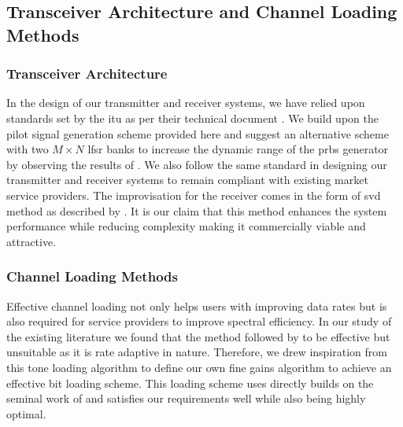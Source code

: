 \subsection{Transceiver Architecture and Channel Loading Methods}
\subsubsection{Transceiver Architecture}
In the design of our transmitter and receiver systems, we have relied upon standards set by the \acrshort{itu} as per their technical document \textcite{ITU2009}. We build upon the \gls{pilot signal} generation scheme provided here and suggest an alternative scheme with two $M \times N$ \acrshort{lfsr} banks to increase the dynamic range of the \acrshort{prbs} generator by observing the results of \textcite{Peinado2013}. We also follow the same \textcite{ITU2009} standard in designing our transmitter and receiver systems to remain compliant with existing market service providers. The improvisation for the receiver comes in the form of \acrlong{svd} method as described by \textcite{Klema1980}. It is our claim that this method enhances the system performance while reducing complexity making it commercially viable and attractive. 

\subsubsection{Channel Loading Methods}
Effective channel loading not only helps users with improving data rates but is also required for service providers to improve spectral efficiency. In our study of the existing literature we found that the method followed by \textcite{Chow1995} to be effective but unsuitable as it is rate adaptive in nature. Therefore, we drew inspiration from this tone loading algorithm to define our own fine gains algorithm to achieve an effective bit loading scheme. This loading scheme uses directly builds on the seminal work of \textcite{Shannon1948} and satisfies our requirements well while also being highly optimal.


